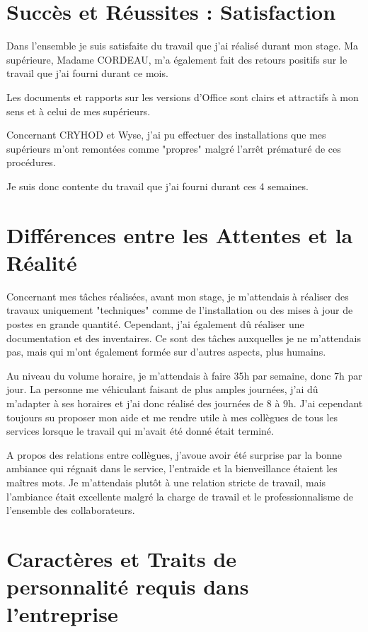 \section{Succès et Réussites : Satisfaction}

Dans l'ensemble je suis satisfaite du travail que j'ai réalisé durant mon stage. Ma supérieure, Madame CORDEAU, m'a également fait des retours positifs sur le travail que j'ai fourni durant ce mois.

Les documents et rapports sur les versions d'Office sont clairs et attractifs à mon sens et à celui de mes supérieurs.

Concernant CRYHOD et Wyse, j'ai pu effectuer des installations que mes supérieurs m'ont remontées comme "propres" malgré l'arrêt prématuré de ces procédures.

Je suis donc contente du travail que j'ai fourni durant ces 4 semaines.


\section{Différences entre les Attentes et la Réalité}

Concernant mes tâches réalisées, avant mon stage, je m’attendais à réaliser des travaux uniquement "techniques" comme de l’installation ou des mises à jour de postes en grande quantité. Cependant, j’ai également dû réaliser une documentation et des inventaires. Ce sont des tâches auxquelles je ne m’attendais pas, mais qui m’ont également formée sur d’autres aspects, plus humains.

Au niveau du volume horaire, je m’attendais à faire 35h par semaine, donc 7h par jour. La personne me véhiculant faisant de plus amples journées, j’ai dû m’adapter à ses horaires et j’ai donc réalisé des journées de 8 à 9h. J’ai cependant toujours su proposer mon aide et me rendre utile à mes collègues de tous les services lorsque le travail qui m’avait été donné était terminé.

A propos des relations entre collègues, j’avoue avoir été surprise par la bonne ambiance qui régnait dans le service, l’entraide et la bienveillance étaient les maîtres mots. Je m’attendais plutôt à une relation stricte de travail, mais l’ambiance était excellente malgré la charge de travail et le professionnalisme de l’ensemble des collaborateurs.


\section{Caractères et Traits de personnalité requis dans l'entreprise}

